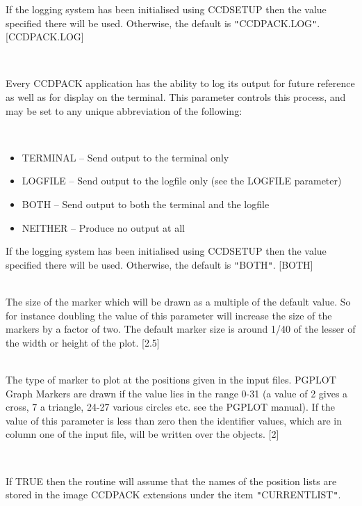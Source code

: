 \documentclass[twoside,11pt]{article}
\newcommand{\htmlref}[2]{#1}
\renewcommand{\_}{\texttt{\symbol{95}}}
\newcommand{\qt}[1]{{\tt "}#1{\tt "}}
\newcommand{\xroutine}[1]{\htmlref{{\sc #1}}{#1}}
\newcommand{\sstsubsection}[1]{ \item[{#1}] \mbox{} \\}
\newcommand{\sstitemlist}[1]{
  \mbox{} \\
  \vspace{-3.5ex}
  \begin{itemize}
     #1
  \end{itemize}
}
\newcommand{\sstitem}{\item}
\newcommand{\sstsubsection}[1]{\item[{#1}]}
\newcommand{\sstitemlist}[1]{
      \begin{itemize}
         #1
      \end{itemize}
      \\
   }
\newcommand{\sstitem}{\item}
\begin{document}
{{{         If the logging system has been initialised using \xroutine{CCDSETUP}
         then the value specified there will be used. Otherwise, the
         default is \qt{CCDPACK.LOG}.
         [CCDPACK.LOG]
      }
      \sstsubsection{
         LOGTO = LITERAL (Read)
      } {
         Every CCDPACK application has the ability to log its output
         for future reference as well as for display on the terminal.
         This parameter controls this process, and may be set to any
         unique abbreviation of the following:
         \sstitemlist{

            \sstitem
               TERMINAL  -- Send output to the terminal only

            \sstitem
               LOGFILE   -- Send output to the logfile only (see the
                               LOGFILE parameter)

            \sstitem
               BOTH      -- Send output to both the terminal and the
                               logfile

            \sstitem
               NEITHER   -- Produce no output at all

         }
         If the logging system has been initialised using \xroutine{CCDSETUP}
         then the value specified there will be used. Otherwise, the
         default is \qt{BOTH}.
         [BOTH]
      }
      \sstsubsection{
         MSIZE = \_REAL (Read)
      } {
         The size of the marker which will be drawn as a multiple of
         the default value. So for instance doubling the value of this
         parameter will increase the size of the markers by a factor of
         two. The default marker size is around 1/40 of the lesser of
         the width or height of the plot.
         [2.5]
      }
      \sstsubsection{
         MTYPE = \_INTEGER (Read)
      } {
         The type of marker to plot at the positions given in the input
         files. PGPLOT Graph Markers are drawn if the value lies in the
         range 0-31 (a value of 2 gives a cross, 7 a triangle, 24-27
         various circles etc. see the PGPLOT manual). If the value of
         this parameter is less than zero then the identifier values,
         which are in column one of the input file, will be written over
         the objects.
         [2]
      }
      \sstsubsection{
         NDFNAMES = \_LOGICAL (Read)
      } {
         If TRUE then the routine will assume that the names of the
         position lists are stored in the image CCDPACK extensions under
         the item \qt{CURRENT\_LIST}.

}}}
\end{document}
